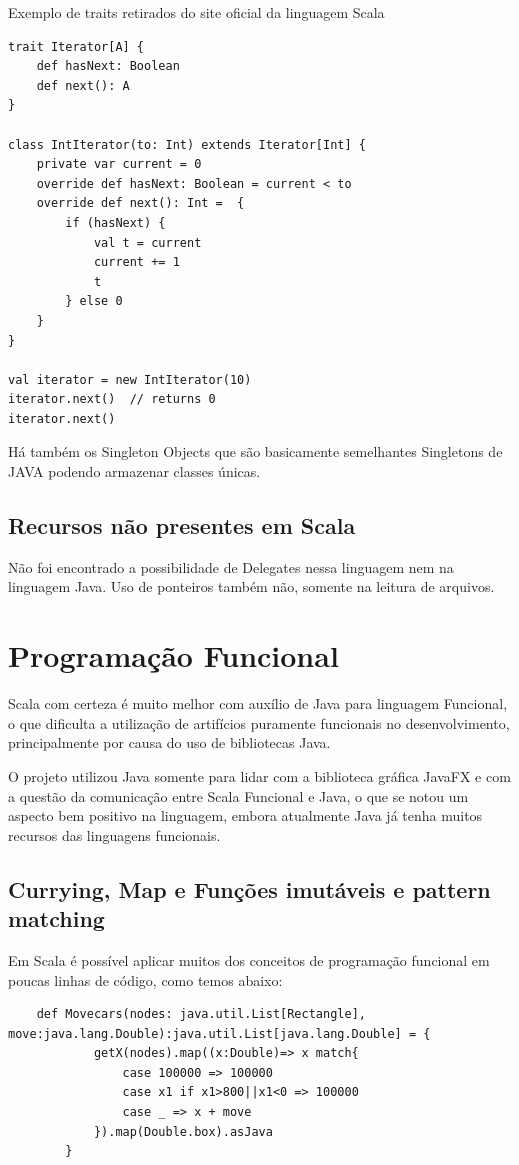 \documentclass[rel-mlp]{iiufrgs}
\begin{document}
   Exemplo de traits retirados do site oficial da linguagem Scala \cite{scala}
   \begin{lstlisting}
trait Iterator[A] {
    def hasNext: Boolean
    def next(): A
}

class IntIterator(to: Int) extends Iterator[Int] {
    private var current = 0
    override def hasNext: Boolean = current < to
    override def next(): Int =  {
        if (hasNext) {
            val t = current
            current += 1
            t
        } else 0
    }
}

val iterator = new IntIterator(10)
iterator.next()  // returns 0
iterator.next() 
   \end{lstlisting}
   
  Há também os Singleton Objects que são basicamente semelhantes Singletons de JAVA podendo armazenar classes únicas.
  
\subsection{Recursos não presentes em Scala}

 Não foi encontrado a possibilidade de Delegates nessa linguagem nem na linguagem Java. Uso de ponteiros também não, somente na leitura de arquivos. 
  

\section{Programação Funcional}

Scala com certeza é muito melhor com auxílio de Java para linguagem Funcional, o que dificulta a utilização de artifícios puramente funcionais no desenvolvimento, principalmente por causa do uso de bibliotecas Java.

 O projeto utilizou Java somente para lidar com a biblioteca gráfica JavaFX e com a questão da comunicação entre Scala Funcional e Java, o que se notou um aspecto bem positivo na linguagem, embora atualmente Java já tenha muitos recursos das linguagens funcionais.

\subsection{Currying, Map e Funções imutáveis e pattern matching}

Em Scala é possível aplicar muitos dos conceitos de programação funcional em poucas linhas de código, como temos abaixo:
\begin{lstlisting}
    def Movecars(nodes: java.util.List[Rectangle], move:java.lang.Double):java.util.List[java.lang.Double] = {
            getX(nodes).map((x:Double)=> x match{
                case 100000 => 100000
                case x1 if x1>800||x1<0 => 100000
                case _ => x + move
            }).map(Double.box).asJava
        }
\end{lstlisting}
\end{document}
